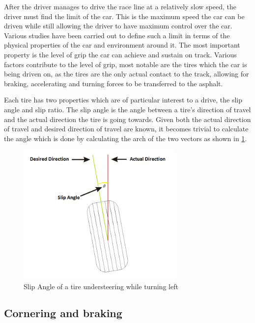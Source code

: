 After the driver manages to drive the race line at a relatively slow speed, the driver must find the limit of the car. This is the maximum speed the car can be driven while still allowing the driver to have maximum control over the car. Various studies have been carried out to define such a limit in terms of the physical properties of the car and environment around it. The most important property is the level of grip the car can achieve and sustain on track. Various factors contribute to the level of grip, most notable are the tires which the car is being driven on, as the tires are the only actual contact to the track, allowing for braking, accelerating and turning forces to be transferred to the asphalt\cite{beckman1991physics}.

Each tire has two properties which are of particular interest to a drive, the slip angle and slip ratio. The slip angle is the angle between a tire’s direction of travel and the actual direction the tire is going towards. Given both the actual direction of travel and desired direction of travel are known, it becomes trivial to calculate the angle which is done by calculating the arch of the two vectors as shown in \ref{fig:slipangle}.

\begin{figure}[!htb]
	\centering
	\includegraphics[height=7cm]{images/slipangle}
	\caption{Slip Angle of a tire understeering while turning left}
	\label{fig:slipangle}
\end{figure}

\subsection{Cornering and braking}

